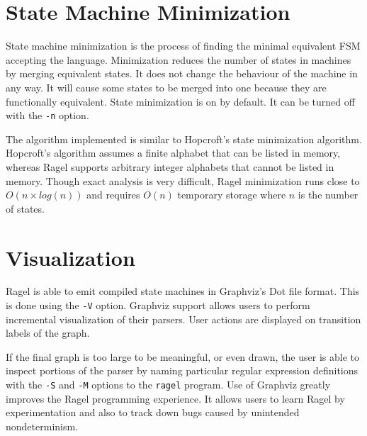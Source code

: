 \documentclass[letterpaper,11pt,oneside]{book}
\begin{document}
\section{State Machine Minimization}

State machine minimization is the process of finding the minimal equivalent FSM accepting
the language. Minimization reduces the number of states in machines
by merging equivalent states. It does not change the behaviour of the machine
in any way. It will cause some states to be merged into one because they are
functionally equivalent. State minimization is on by default. It can be turned
off with the \verb|-n| option.

The algorithm implemented is similar to Hopcroft's state minimization
algorithm. Hopcroft's algorithm assumes a finite alphabet that can be listed in
memory, whereas Ragel supports arbitrary integer alphabets that cannot be
listed in memory. Though exact analysis is very difficult, Ragel minimization
runs close to $O(n \times log(n))$ and requires $O(n)$ temporary storage where
$n$ is the number of states.

\section{Visualization}
\label{visualization}


Ragel is able to emit compiled state machines in Graphviz's Dot file format.
This is done using the \verb|-V| option.
Graphviz support allows users to perform
incremental visualization of their parsers. User actions are displayed on
transition labels of the graph. 

If the final graph is too large to be
meaningful, or even drawn, the user is able to inspect portions of the parser
by naming particular regular expression definitions with the \verb|-S| and
\verb|-M| options to the \verb|ragel| program. Use of Graphviz greatly
improves the Ragel programming experience. It allows users to learn Ragel by
experimentation and also to track down bugs caused by unintended
nondeterminism.
\end{document}
